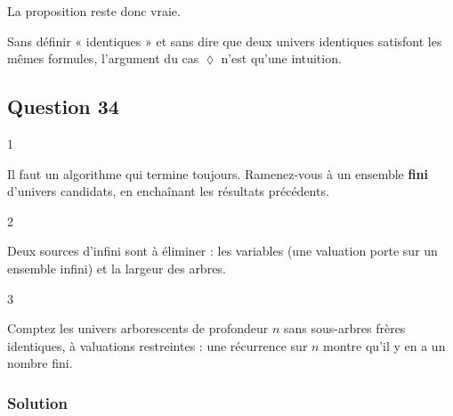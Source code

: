 \documentclass[11pt,a4paper]{article}
\providecommand{\Diamond}{\lozenge}
\begin{document}
La proposition reste donc vraie.

\begin{piege}

Sans définir « identiques » et sans dire que deux univers identiques satisfont les mêmes formules, l'argument du cas \(\Diamond\) n'est qu'une intuition.

\end{piege}

\hypertarget{question-34}{%
\subsection{Question 34}\label{question-34}}

\begin{indication}{1}

Il faut un algorithme qui termine toujours. Ramenez-vous à un ensemble \textbf{fini} d'univers candidats, en enchaînant les résultats précédents.

\end{indication}

\begin{indication}{2}

Deux sources d'infini sont à éliminer : les variables (une valuation porte sur un ensemble infini) et la largeur des arbres.

\end{indication}

\begin{indication}{3}

Comptez les univers arborescents de profondeur \(n\) sans sous-arbres frères identiques, à valuations restreintes : une récurrence sur \(n\) montre qu'il y en a un nombre fini.

\end{indication}

\hypertarget{solution-33}{%
\subsubsection{Solution}\label{solution-33}}
\end{document}
